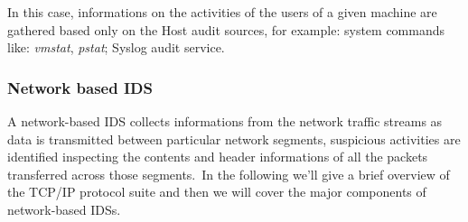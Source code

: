 					In this case, informations on the activities of the users of a given machine are gathered based only on the Host audit sources, for example: system commands like: \textit{vmstat}, \textit{pstat}; Syslog audit service.
				 
				\subsubsection*{Network based IDS}

					A network-based IDS collects informations from the network traffic streams  as data is transmitted between particular network segments, suspicious activities are identified inspecting the contents and header informations of all the packets transferred across those segments.\ In the following we'll give a brief overview of the TCP/IP protocol suite and then we will cover the major components of network-based IDSs.

